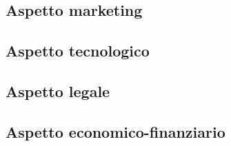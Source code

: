 \subsection{Aspetto marketing}

\newpage

\subsection{Aspetto tecnologico}

\newpage

\subsection{Aspetto legale}

\newpage

\subsection{Aspetto economico-finanziario}
